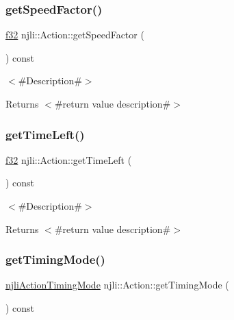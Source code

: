 \subsubsection{\texorpdfstring{get\+Speed\+Factor()}{getSpeedFactor()}}
{\footnotesize\ttfamily \mbox{\hyperlink{_util_8h_a5f6906312a689f27d70e9d086649d3fd}{f32}} njli\+::\+Action\+::get\+Speed\+Factor (\begin{DoxyParamCaption}{ }\end{DoxyParamCaption}) const}

$<$\#\+Description\#$>$

\begin{DoxyReturn}{Returns}
$<$\#return value description\#$>$ 
\end{DoxyReturn}
\mbox{\label{classnjli_1_1_action_a62fdaf50d4555346103e8f4fd388ed38}} 
\subsubsection{\texorpdfstring{get\+Time\+Left()}{getTimeLeft()}}
{\footnotesize\ttfamily \mbox{\hyperlink{_util_8h_a5f6906312a689f27d70e9d086649d3fd}{f32}} njli\+::\+Action\+::get\+Time\+Left (\begin{DoxyParamCaption}{ }\end{DoxyParamCaption}) const}

$<$\#\+Description\#$>$

\begin{DoxyReturn}{Returns}
$<$\#return value description\#$>$ 
\end{DoxyReturn}
\mbox{\label{classnjli_1_1_action_ab0c079cfbeb80643e147ea7899e32a50}} 
\subsubsection{\texorpdfstring{get\+Timing\+Mode()}{getTimingMode()}}
{\footnotesize\ttfamily \mbox{\hyperlink{namespacenjli_affc383078a5935be1509062828a1824b}{njli\+Action\+Timing\+Mode}} njli\+::\+Action\+::get\+Timing\+Mode (\begin{DoxyParamCaption}{ }\end{DoxyParamCaption}) const}

